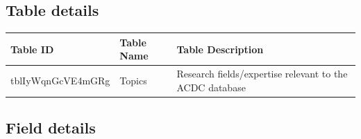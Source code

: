 \documentclass[
]{book}
\begin{document}
\hypertarget{table-details-9}{%
\subsection{Table details}\label{table-details-9}}

\begin{table}
\centering
\begin{tabular}{l|l|l}
\hline
\textbf{Table ID} & \textbf{Table Name} & \textbf{Table Description}\\
\hline
tblIyWqnGcVE4mGRg & Topics & Research fields/expertise relevant to the ACDC database\\
\hline
\end{tabular}
\end{table}

\hypertarget{field-details-6}{%
\subsection{Field details}\label{field-details-6}}
\end{document}
